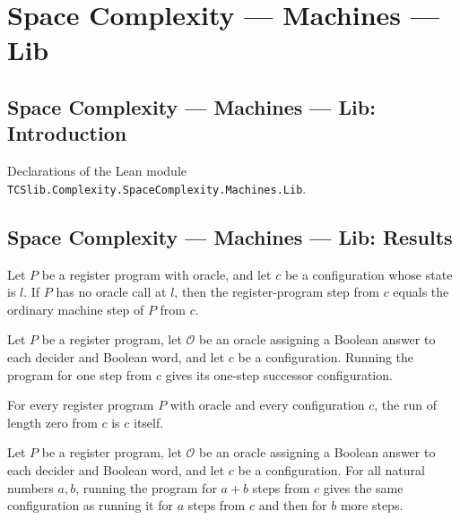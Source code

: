\section{Space Complexity --- Machines --- Lib}
\subsection*{Space Complexity --- Machines --- Lib: Introduction}

Declarations of the Lean module \texttt{TCSlib.Complexity.SpaceComplexity.Machines.Lib}.

\subsection*{Space Complexity --- Machines --- Lib: Results}

\begin{lemma}
\label{Complexity.LogProg.rstep_noncall}
\leanok
{}
Let $P$ be a register program with oracle, and let $c$ be a configuration whose state is
$l$. If $P$ has no oracle call at $l$, then the register-program step from $c$ equals
the ordinary machine step of $P$ from $c$.
\end{lemma}

\begin{lemma}
\label{Complexity.LogProg.rrun_one}
\leanok
{}
Let $P$ be a register program, let $\mathcal O$ be an oracle assigning a Boolean answer
to each decider and Boolean word, and let $c$ be a configuration. Running the program
for one step from $c$ gives its one-step successor configuration.
\end{lemma}

\begin{lemma}
\label{Complexity.LogProg.rrun_zero}
\leanok
{}
For every register program $P$ with oracle and every configuration $c$, the run of
length zero from $c$ is $c$ itself.
\end{lemma}

\begin{lemma}
\label{Complexity.LogProg.rrun_add}
\leanok
{}
Let $P$ be a register program, let $\mathcal O$ be an oracle assigning a Boolean answer
to each decider and Boolean word, and let $c$ be a configuration. For all natural
numbers $a,b$, running the program for $a+b$ steps from $c$ gives the same configuration
as running it for $a$ steps from $c$ and then for $b$ more steps.
\end{lemma}

